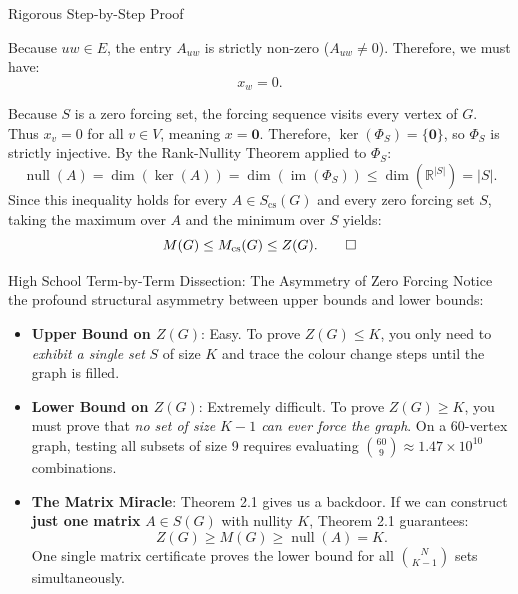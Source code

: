 \documentclass[11pt]{article}
\begin{document}
\begin{defbox}{Rigorous Step-by-Step Proof}
\begin{itemize}[leftmargin=*,nosep]
  Because $uw \in E$, the entry $A_{uw}$ is strictly non-zero ($A_{uw} \ne 0$). Therefore, we must have:
  \begin{equation}
    x_w = 0.
  \end{equation}
\end{itemize}
Because $S$ is a zero forcing set, the forcing sequence visits every vertex of $G$. Thus $x_v = 0$ for all $v \in V$, meaning $x = \mathbf{0}$.
Therefore, $\ker(\Phi_S) = \{\mathbf{0}\}$, so $\Phi_S$ is strictly injective.
By the Rank-Nullity Theorem applied to $\Phi_S$:
\begin{equation}
  \operatorname{null}(A) = \dim(\ker(A)) = \dim(\operatorname{im}(\Phi_S)) \le \dim(\mathbb{R}^{|S|}) = |S|.
\end{equation}
Since this inequality holds for every $A \in S_{\mathrm{cs}}(G)$ and every zero forcing set $S$, taking the maximum over $A$ and the minimum over $S$ yields:
\begin{equation}
  M(G) \le M_{\mathrm{cs}}(G) \le Z(G). \qedhere
\end{equation}
\end{defbox}

\begin{callbox}{High School Term-by-Term Dissection: The Asymmetry of Zero Forcing}
Notice the profound structural asymmetry between upper bounds and lower bounds:
\begin{itemize}[leftmargin=*,nosep]
  \item \textbf{Upper Bound on $Z(G)$}: Easy. To prove $Z(G) \le K$, you only need to \emph{exhibit a single set} $S$ of size $K$ and trace the colour change steps until the graph is filled.
  \item \textbf{Lower Bound on $Z(G)$}: Extremely difficult. To prove $Z(G) \ge K$, you must prove that \emph{no set of size $K-1$ can ever force the graph}. On a 60-vertex graph, testing all subsets of size 9 requires evaluating $\binom{60}{9} \approx 1.47 \times 10^{10}$ combinations.
  \item \textbf{The Matrix Miracle}: Theorem 2.1 gives us a backdoor. If we can construct \textbf{just one matrix} $A \in S(G)$ with nullity $K$, Theorem 2.1 guarantees:
  \begin{equation}
    Z(G) \ge M(G) \ge \operatorname{null}(A) = K.
  \end{equation}
  One single matrix certificate proves the lower bound for all $\binom{N}{K-1}$ sets simultaneously.
\end{itemize}
\end{callbox}
\end{document}
